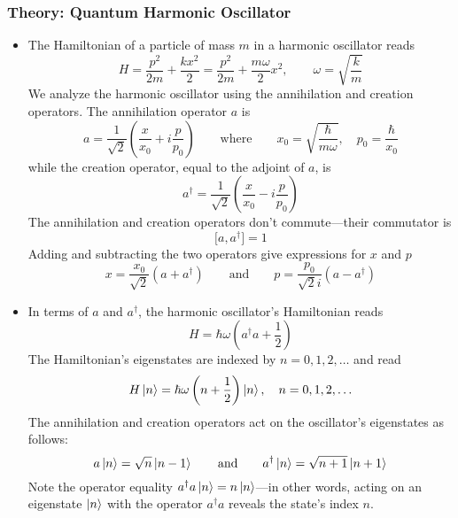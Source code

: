 \documentclass[11pt, a4paper]{article}
\newcommand{\eqtext}[1]{\qquad \text{#1} \qquad}
\begin{document}
\subsubsection{Theory: Quantum Harmonic Oscillator}
\begin{itemize}
	\item The Hamiltonian of a particle of mass $ m $ in a harmonic oscillator reads
	\begin{equation*}
		H = \frac{p^{2}}{2m} + \frac{kx^{2}}{2} = \frac{p^{2}}{2m} + \frac{m\omega}{2}x^{2}, \qquad \omega = \sqrt{\frac{k}{m}}
	\end{equation*}
	We analyze the harmonic oscillator using the annihilation and creation operators. The annihilation operator $ a $ is
	\begin{equation*}
		a = \frac{1}{\sqrt{2}}\left(\frac{x}{x_{0}} + i\frac{p}{p_{0}}\right) \eqtext{where} x_{0} = \sqrt{\frac{\hbar}{m\omega}}, \quad p_{0} = \frac{\hbar}{x_{0}}
	\end{equation*}
	while the creation operator, equal to the adjoint of $ a $, is
	\begin{equation*}
		a^{\dagger} = \frac{1}{\sqrt{2}}\left(\frac{x}{x_{0}} - i\frac{p}{p_{0}}\right)
	\end{equation*}
	The annihilation and creation operators don't commute---their commutator is 
	\begin{equation*}
		\big[a, a^{\dagger}\big] = 1
	\end{equation*}
	Adding and subtracting the two operators give expressions for $ x $ and $ p $
	\begin{equation*}
		x = \frac{x_{0}}{\sqrt{2}}(a + a^{\dagger}) \eqtext{and} p = \frac{p_{0}}{\sqrt{2}i}(a - a^{\dagger})
	\end{equation*}
	
	\item In terms of $ a $ and $ a^{\dagger} $, the harmonic oscillator's Hamiltonian reads
	\begin{equation*}
		H = \hbar \omega\left (a^{\dagger}a + \frac{1}{2}\right )
	\end{equation*}
	The Hamiltonian's eigenstates are indexed by $ n = 0, 1, 2, \ldots $ and read
	\begin{equation*}
		H \ket{n} = \hbar \omega \left(n + \frac{1}{2}\right)\ket{n}, \quad n = 0, 1, 2, \ldots
	\end{equation*}
	The annihilation and creation operators act on the oscillator's eigenstates as follows:
	\begin{equation*}
		a\ket{n} = \sqrt{n}\ket{n-1} \eqtext{and} a^{\dagger} \ket{n} = \sqrt{n + 1} \ket{n+1}
	\end{equation*}
	Note the operator equality $ a^{\dagger}a \ket{n} = n \ket{n}$---in other words, acting on an eigenstate $ \ket{n} $  with the operator $ a^{\dagger}a $ reveals the state's index $ n $. 
\end{itemize}
\end{document}
